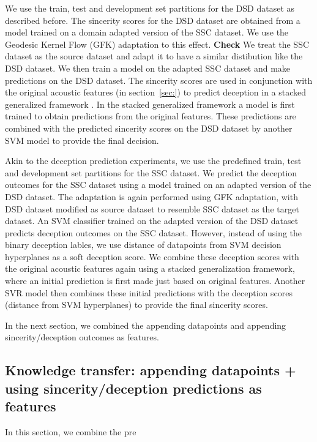 \documentclass{article}
\begin{document}
We use the train, test and development set partitions for the DSD dataset as described before.
The sincerity scores for the DSD dataset are obtained from a model trained on a domain adapted version of the SSC dataset.
We use the Geodesic Kernel Flow (GFK) adaptation \cite{} to this effect.
{\bf Check} We treat the SSC dataset as the source dataset and adapt it to have a similar distibution like the DSD dataset. 
We then train a model on the adapted SSC dataset and make predictions on the DSD dataset.
The sincerity scores are used in conjunction with the original acoustic features (in section~\ref{sec:}) to predict deception in a stacked generalized framework \cite{}.
In the stacked generalized framework a model is first trained to obtain predictions from the original features. 
These predictions are combined with the predicted sincerity scores on the DSD dataset by another SVM model to provide the final decision. 

Akin to the deception prediction experiments, we use the predefined train, test and development set partitions for the SSC dataset.
We predict the deception outcomes for the SSC dataset using a model trained on an adapted version of the DSD dataset.
The adaptation is again performed using GFK adaptation, with DSD dataset modified as source dataset to resemble SSC dataset as the target dataset.
An SVM classifier trained on the adapted version of the DSD dataset predicts deception outcomes on the SSC dataset. 
However, instead of using the binary deception lables, we use distance of datapoints from SVM decision hyperplanes as a soft deception score. 
We combine these deception scores with the original acoustic features again using a stacked generalization framework, where an initial prediction is first made just based on original features. 
Another SVR model then combines these initial predictions with the deception scores (distance from SVM hyperplanes) to provide the final sincerity scores.  

In the next section, we combined the appending datapoints and appending sincerity/deception outcomes as features. 

\subsection{Knowledge transfer: appending datapoints + using sincerity/deception predictions as features}
In this section, we combine the pre
\end{document}
